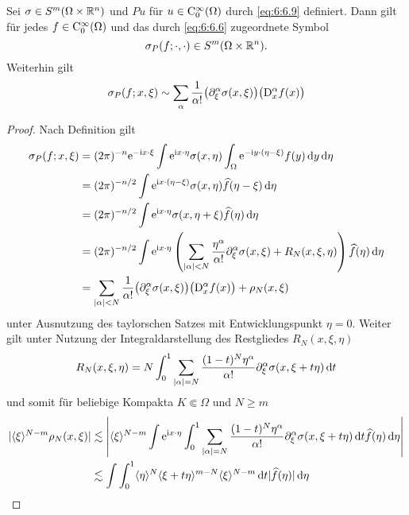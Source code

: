 \begin{lem}
Sei $\sigma\in S^m(\Omega\times\mathbb R^n)$ und $Pu$ für $u\in\mathrm C_0^\infty(\Omega)$ durch \eqref{eq:6:6.9} definiert. Dann gilt für jedes $f\in\mathrm C_0^\infty(\Omega)$
und das durch \eqref{eq:6:6.6} zugeordnete Symbol
\begin{equation}
    \sigma_P(f;\cdot,\cdot)\in S^m(\Omega\times\mathbb R^n). 
\end{equation}
Weiterhin gilt
\begin{equation}
   \sigma_P(f;x,\xi) \sim \sum_{\alpha}  \frac{1}{\alpha!} \big( \partial_\xi^\alpha \sigma(x,\xi) \big) \big(\mathrm D_x^\alpha f(x)\big)
\end{equation}
\end{lem}
\begin{proof}
Nach Definition gilt
\begin{align}
   \sigma_P(f;x,\xi) &=(2\pi)^{-n}  \mathrm e^{-\mathrm i x\cdot\xi} \int \mathrm e^{\mathrm i x\cdot\eta} \sigma(x,\eta) \int_\Omega \mathrm e^{-\mathrm i y\cdot(\eta-\xi)} f(y) \,\mathrm d y \,\mathrm d\eta \notag\\
   & = (2\pi)^{-n/2}  \int \mathrm e^{\mathrm i x\cdot(\eta-\xi)} \sigma(x,\eta) \widehat f(\eta-\xi)\,\mathrm d\eta \notag\\
   & = (2\pi)^{-n/2}  \int \mathrm e^{\mathrm i x\cdot\eta} \sigma(x,\eta+\xi) \widehat f(\eta)\,\mathrm d\eta \notag\\
   & = (2\pi)^{-n/2}  \int \mathrm e^{\mathrm i x\cdot\eta} \left( \sum_{|\alpha|<N} \frac{\eta^\alpha}{\alpha!} \partial_\xi^\alpha \sigma(x,\xi) + R_N(x,\xi,\eta) \right) \widehat f(\eta)\,\mathrm d\eta \notag\\  
   & =  \sum_{|\alpha|<N} \frac{1}{\alpha!} \big( \partial_\xi^\alpha \sigma(x,\xi) \big) \big(\mathrm D_x^\alpha f(x)\big)  +
   \rho_N(x,\xi)
\end{align}
unter Ausnutzung des taylorschen Satzes mit Entwicklungspunkt $\eta=0$. Weiter gilt unter Nutzung der Integraldarstellung des Restgliedes $R_N(x,\xi,\eta)$ 
\begin{equation}
   R_N(x,\xi,\eta) = N \int_0^1 \sum_{|\alpha|=N} \frac{(1-t)^N \eta^\alpha}{\alpha!} \partial_\xi^\alpha \sigma(x,\xi+t\eta) \,\mathrm d t 
\end{equation}
und somit für beliebige Kompakta $K\Subset\Omega$ und $N\ge m$
\begin{align}
   |\langle\xi\rangle^{N-m} \rho_N(x,\xi)|& \lesssim 
   \left|\langle\xi\rangle^{N-m}  \int \e^{\i x\cdot\eta} \int_0^1 \sum_{|\alpha|=N} \frac{(1-t)^N \eta^\alpha}{\alpha!} \partial_\xi^\alpha \sigma(x,\xi+t\eta) \d t  \widehat f(\eta) \d\eta   \right| \notag\\
&\lesssim  \int \int_0^1 \langle\eta\rangle^N \langle\xi+t\eta\rangle^{m-N} \langle\xi\rangle^{N-m} \d t | \widehat f(\eta) |\d\eta   

\end{align}
\end{proof}
